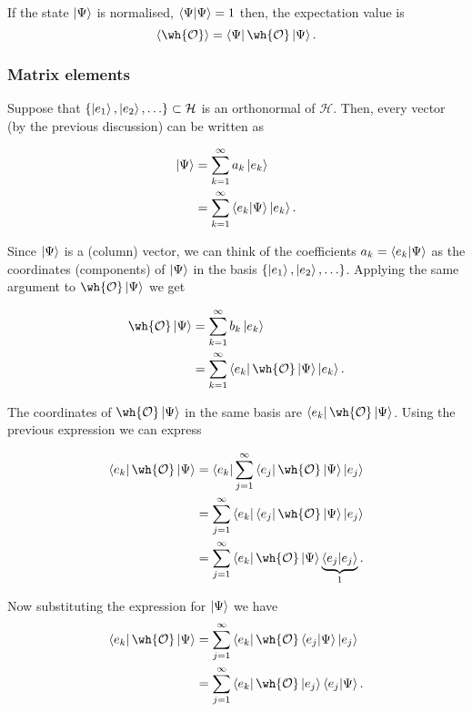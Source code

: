 \documentclass[12pt, a4paper]{article}
\begin{document}
\begin{corollary}
    If the state \(\ket{\Psi}\) is normalised, \(\bra{\Psi} \ket{\Psi}=1\) then, the expectation value is  
    \[\langle \wh{\mathcal{O}}\rangle  = \bra{\Psi} \wh{\mathcal{O}} \ket{\Psi}.\]
\end{corollary}

\subsubsection{Matrix elements}

Suppose that \(\{\ket{e_1}, \ket{e_2}, \ldots\} \subset \mathcal{H}\) is an orthonormal of \(\mathcal{H}\). Then, every vector (by the previous discussion) can be written as 

\[\begin{aligned}
    \ket{\Psi} &= \sum_{k=1}^{\infty} a_k \ket{e_k} \\
    &= \sum_{k=1}^{\infty} \bra{e_k} \ket{\Psi} \ket{e_k}.
\end{aligned}\]

Since \(\ket{\Psi}\) is a (column) vector, we can think of the coefficients \(a_k = \bra{e_k}\ket{\Psi}\) as the coordinates (components) of \(\ket{\Psi}\) in the basis \(\{\ket{e_1}, \ket{e_2}, \ldots\}\). Applying the same argument to \(\wh{\mathcal{O}} \ket{\Psi}\) we get 

\[\begin{aligned}
    \wh{\mathcal{O}} \ket{\Psi} &= \sum_{k=1}^{\infty} b_k \ket{e_k} \\
    &= \sum_{k=1}^{\infty} \bra{e_k} \wh{\mathcal{O}} \ket{\Psi} \ket{e_k}.
\end{aligned}\]

The coordinates of \(\wh{\mathcal{O}} \ket{\Psi}\) in the same basis are \(\bra{e_k} \wh{\mathcal{O}} \ket{\Psi}\). Using the previous expression we can express 

\[\begin{aligned}
    \bra{e_k} \wh{\mathcal{O}} \ket{\Psi} &= \bra{e_k} \sum_{j=1}^{\infty} \bra{e_j} \wh{\mathcal{O}} \ket{\Psi}\ket{e_j} \\
    &= \sum_{j=1}^{\infty} \bra{e_k} \bra{e_j} \wh{\mathcal{O}} \ket{\Psi}\ket{e_j} \\
    &= \sum_{j=1}^{\infty} \bra{e_k} \wh{\mathcal{O}} \ket{\Psi}\underbrace{\bra{e_j}\ket{e_j}}_{1}.
\end{aligned}\]

Now substituting the expression for \(\ket{\Psi}\) we have 
\[\begin{aligned}
    \bra{e_k} \wh{\mathcal{O}} \ket{\Psi} &= \sum_{j=1}^{\infty} \bra{e_k} \wh{\mathcal{O}} \bra{e_j} \ket{\Psi} \ket{e_j} \\
    &= \sum_{j=1}^{\infty} \bra{e_k} \wh{\mathcal{O}} \ket{e_j} \bra{e_j}\ket{\Psi}.
\end{aligned}\]
\end{document}
